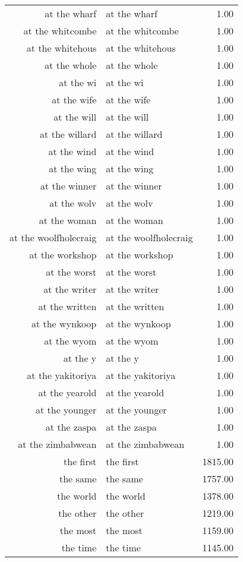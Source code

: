 \begin{table}[ht]
\begin{tabular}{rlr}
  at the wharf & at the wharf & 1.00 \\ 
  at the whitcombe & at the whitcombe & 1.00 \\ 
  at the whitehous & at the whitehous & 1.00 \\ 
  at the whole & at the whole & 1.00 \\ 
  at the wi & at the wi & 1.00 \\ 
  at the wife & at the wife & 1.00 \\ 
  at the will & at the will & 1.00 \\ 
  at the willard & at the willard & 1.00 \\ 
  at the wind & at the wind & 1.00 \\ 
  at the wing & at the wing & 1.00 \\ 
  at the winner & at the winner & 1.00 \\ 
  at the wolv & at the wolv & 1.00 \\ 
  at the woman & at the woman & 1.00 \\ 
  at the woolfholecraig & at the woolfholecraig & 1.00 \\ 
  at the workshop & at the workshop & 1.00 \\ 
  at the worst & at the worst & 1.00 \\ 
  at the writer & at the writer & 1.00 \\ 
  at the written & at the written & 1.00 \\ 
  at the wynkoop & at the wynkoop & 1.00 \\ 
  at the wyom & at the wyom & 1.00 \\ 
  at the y & at the y & 1.00 \\ 
  at the yakitoriya & at the yakitoriya & 1.00 \\ 
  at the yearold & at the yearold & 1.00 \\ 
  at the younger & at the younger & 1.00 \\ 
  at the zaspa & at the zaspa & 1.00 \\ 
  at the zimbabwean & at the zimbabwean & 1.00 \\ 
  the first & the first & 1815.00 \\ 
  the same & the same & 1757.00 \\ 
  the world & the world & 1378.00 \\ 
  the other & the other & 1219.00 \\ 
  the most & the most & 1159.00 \\ 
  the time & the time & 1145.00 \\ 

\end{tabular}
\end{table}
